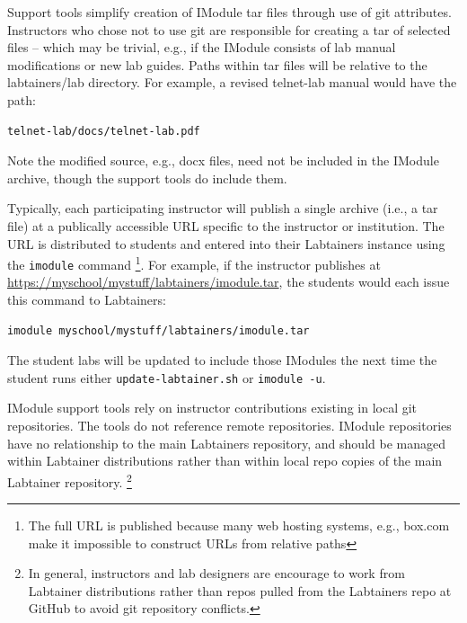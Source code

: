 \documentclass[12pt]{article}
\begin{document}
Support tools simplify creation of IModule tar files through use of git attributes.
Instructors who chose not to use git are responsible for creating a tar of selected
files -- which may be trivial, e.g., if the IModule consists of lab manual modifications
or new lab guides.  Paths within tar files will be relative to the labtainers/lab
directory.  For example, a revised telnet-lab manual would have the path:
\begin{verbatim}
telnet-lab/docs/telnet-lab.pdf
\end{verbatim}
\noindent Note the modified source, e.g., docx files, need not be included in the IModule
archive, though the support tools do include them.

Typically, each participating instructor will publish a single archive (i.e., a tar file)
at a publically accessible URL specific to the instructor or institution. The URL 
is distributed to students and entered into their Labtainers 
instance using the {\tt imodule} command \footnote{The full URL is published because many
web hosting systems, e.g., box.com make it impossible to construct URLs from relative paths}.  
For example, if the instructor publishes
at \url{https://myschool/mystuff/labtainers/imodule.tar}, the students would each issue
this command to Labtainers:
\begin{verbatim}
imodule myschool/mystuff/labtainers/imodule.tar
\end{verbatim} 

The student labs will be updated to include those IModules the next time the student runs
either {\tt update-labtainer.sh} or {\tt imodule -u}.

IModule support tools rely on instructor contributions existing in local git repositories.
The tools do not reference remote repositories.  IModule repositories have no relationship
to the main Labtainers repository, and should be managed within Labtainer
distributions rather than within local repo copies of the main Labtainer repository.   \footnote{In general,
instructors and lab designers are encourage to work from Labtainer distributions rather
than repos pulled from the Labtainers repo at GitHub to avoid git repository conflicts.}
\end{document}
